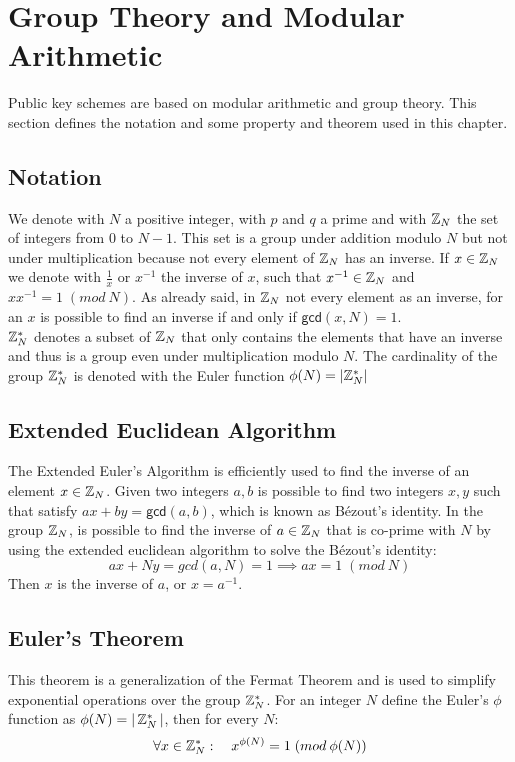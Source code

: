 \section{Group Theory and Modular Arithmetic}
Public key schemes are based on modular arithmetic and group theory. This section defines the notation and some property and theorem used in this chapter.
\subsection{Notation}
We denote with $N$ a positive integer, with $p$ and $q$ a prime and with $\mathbb{Z}_N$ the set of integers from $0$ to $N-1$. This set is a group under addition modulo $N$ but not under multiplication because not every element of $\mathbb{Z}_N$ has an inverse. If $x \in \mathbb{Z}_N$ we denote with $\frac{1}{x}$ or $x^{-1}$ the inverse of $x$, such that $x^{-1} \in \mathbb{Z}_N$ and $xx^{-1} = 1 \; (mod \: N)$. As already said, in $\mathbb{Z}_N$ not every element as an inverse, for an $x$ is possible to find an inverse if and only if $\mathsf{gcd}(x,N) = 1$.\\
$\mathbb{Z}_N^{*}$ denotes a subset of $\mathbb{Z}_N$ that only contains the elements that have an inverse and thus is a group even under multiplication modulo $N$. The cardinality of the group $\mathbb{Z}_N^{*}$ is denoted with the Euler function $\phi(N) = |\mathbb{Z}_N^{*}|$
\subsection{Extended Euclidean Algorithm}
The Extended Euler's Algorithm is efficiently used to find the inverse of an element $x \in \mathbb{Z}_N$. Given two integers $a, b$ is possible to find two integers $x, y$ such that satisfy $ax + by = \mathsf{gcd}(a, b)$, which is known as Bézout's identity.
In the group $\mathbb{Z}_N$, is possible to find the inverse of $a \in \mathbb{Z}_N$ that is co-prime with $N$ by using the extended euclidean algorithm to solve the Bézout's identity:
$$
   ax+Ny = gcd(a, N) = 1 \implies ax = 1 \; (mod \: N)
$$
Then $x$ is the inverse of $a$, or $x = a^{-1}$.
\subsection{Euler's Theorem}
This theorem is a generalization of the Fermat Theorem and is used to simplify exponential operations over the group $\mathbb{Z}_N^{*}$. For an integer $N$ define the Euler's $\phi$ function as $\phi(N) = | \, \mathbb{Z}_N^{*} \, |$, then for every $N$:
$$\forall x \in \mathbb{Z}_N^{*}: \quad x^{\phi(N)} = 1 \; (mod \: \phi(N))$$
